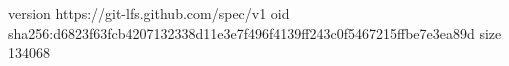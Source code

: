 version https://git-lfs.github.com/spec/v1
oid sha256:d6823f63fcb4207132338d11e3e7f496f4139ff243c0f5467215ffbe7e3ea89d
size 134068
